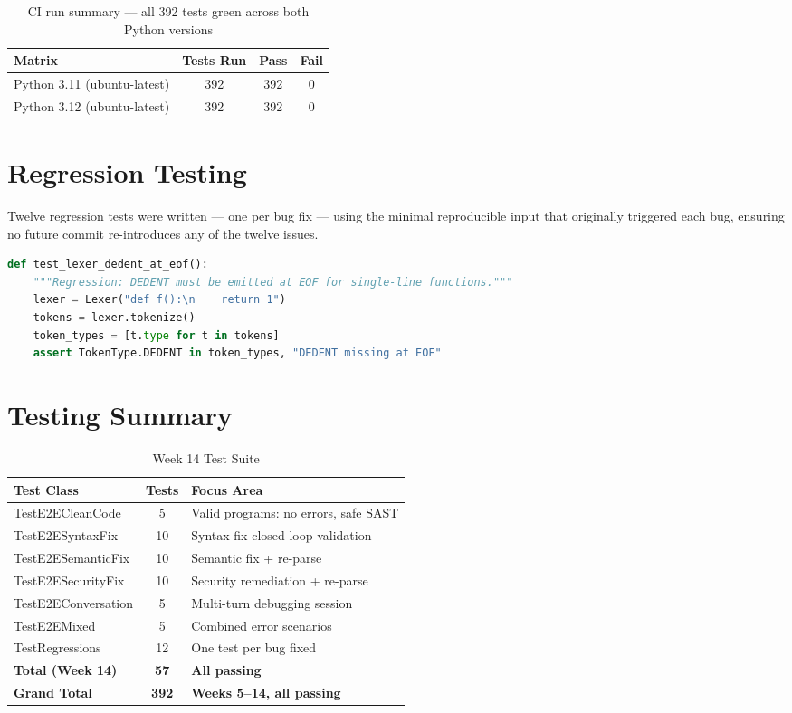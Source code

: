 \documentclass[a4paper,11pt]{article}
\begin{document}
\begin{table}[h]
\centering
\begin{tabularx}{\textwidth}{|l|c|c|c|}
\hline
\rowcolor{orange!10}
\textbf{Matrix} & \textbf{Tests Run} & \textbf{Pass} & \textbf{Fail} \\
\hline
Python 3.11 (ubuntu-latest) & 392 & 392 & 0 \\
\hline
Python 3.12 (ubuntu-latest) & 392 & 392 & 0 \\
\hline
\end{tabularx}
\caption{CI run summary --- all 392 tests green across both Python versions}
\end{table}

\section{Regression Testing}

Twelve regression tests were written --- one per bug fix --- using the minimal reproducible input that originally triggered each bug,  ensuring no future commit re-introduces any of the twelve issues.

\begin{lstlisting}[language=Python, caption=Regression test example (Bug \#1)]
def test_lexer_dedent_at_eof():
    """Regression: DEDENT must be emitted at EOF for single-line functions."""
    lexer = Lexer("def f():\n    return 1")
    tokens = lexer.tokenize()
    token_types = [t.type for t in tokens]
    assert TokenType.DEDENT in token_types, "DEDENT missing at EOF"
\end{lstlisting}

\section{Testing Summary}

\begin{table}[h]
\centering
\begin{tabularx}{\textwidth}{|l|c|X|}
\hline
\rowcolor{orange!10}
\textbf{Test Class} & \textbf{Tests} & \textbf{Focus Area} \\
\hline
TestE2ECleanCode & 5 & Valid programs: no errors, safe SAST \\
\hline
TestE2ESyntaxFix & 10 & Syntax fix closed-loop validation \\
\hline
TestE2ESemanticFix & 10 & Semantic fix + re-parse \\
\hline
TestE2ESecurityFix & 10 & Security remediation + re-parse \\
\hline
TestE2EConversation & 5 & Multi-turn debugging session \\
\hline
TestE2EMixed & 5 & Combined error scenarios \\
\hline
TestRegressions & 12 & One test per bug fixed \\
\hline
\textbf{Total (Week 14)} & \textbf{57} & \textbf{All passing} \\
\hline
\textbf{Grand Total} & \textbf{392} & \textbf{Weeks 5--14, all passing} \\
\hline
\end{tabularx}
\caption{Week 14 Test Suite}
\end{table}
\end{document}
